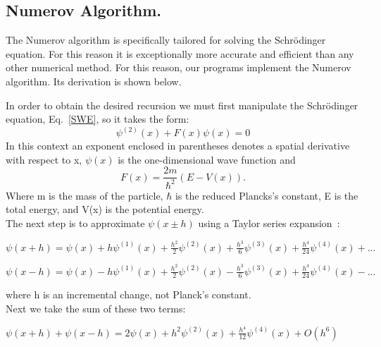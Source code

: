 \documentclass[aps,prl,twocolumn,superscriptaddress]{revtex4-1}
\begin{document}
\subsection{Numerov Algorithm.}

The Numerov algorithm is specifically tailored for solving the Schr\"{o}dinger 
equation.  For this reason it is exceptionally more accurate and efficient 
than any other numerical method.  For this reason, our programs implement 
the Numerov algorithm.  Its derivation is shown below.



In order to obtain the desired recursion we must first manipulate the Schr\"{o}dinger 
equation, Eq.~\ref{SWE}, so it takes the form:
\begin{equation}
 \psi^{(2)}(x) + F(x) \psi(x) = 0	\label{psiF}
\end{equation}
In this context an exponent enclosed in parentheses denotes a spatial derivative with respect to x, $\psi(x)$ is 
the one-dimensional wave function and
$$F(x) = \frac{2m}{\hbar^2}(E-V(x)).$$
Where m is the mass of the particle, $\hbar$ is the reduced Plancks's constant, E is 
the total energy, and V(x) is the potential energy.\\
The next step is to approximate $\psi (x \pm h)$ using a Taylor series expansion~\cite{Javapsi}:

 
\begin{center}

$\psi(x+h)=\psi(x) + h \psi^{(1)}(x) + \frac{h^2}{2} \psi^{(2)}(x) + \frac{h^3}{6} \psi^{(3)}(x)+\frac{h^4}{24}\psi^{(4)}(x)+...$
\end{center}
\begin{center}
$\psi(x-h)=\psi(x)-h\psi^{(1)}(x)+\frac{h^2}{2}\psi^{(2)}(x)-\frac{h^3}{6}\psi^{(3)}(x)+\frac{h^4}{24}\psi^{(4)}(x)-...$
\end{center}
where h is an incremental change, not Planck's constant.\\
Next we take the sum of these two terms:
\begin{center}
$\psi(x+h)+\psi(x-h) = 2\psi(x) + h^2\psi^{(2)}(x) + \frac{h^4}{12}\psi^{(4)}(x)+O(h^6)$	\label{3.3}
\end{center}
\end{document}
